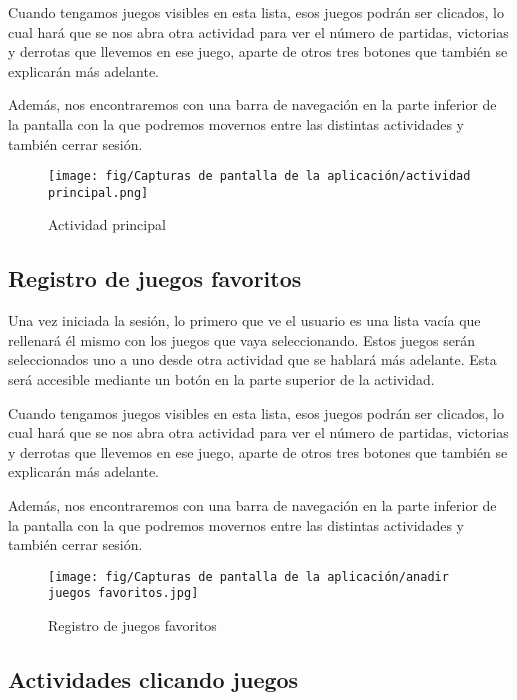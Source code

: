 Cuando tengamos juegos visibles en esta lista, esos juegos podrán ser clicados, lo cual hará que se nos abra otra actividad para ver el número de partidas, victorias y derrotas que llevemos en ese juego, aparte de otros tres botones que también se explicarán más adelante.

Además, nos encontraremos con una barra de navegación en la parte inferior de la pantalla con la que podremos movernos entre las distintas actividades y también cerrar sesión.


\begin{figure}[H]
    \centering
    \texttt{[image: fig/Capturas de pantalla de la aplicación/actividad principal.png]}
    \caption{Actividad principal}
    \label{fig:actividad principal}
\end{figure}

\subsection{Registro de juegos favoritos}\label{cap:Actividad principal}

Una vez iniciada la sesión, lo primero que ve el usuario es una lista vacía que rellenará él mismo con los juegos que vaya seleccionando. Estos juegos serán seleccionados uno a uno desde otra actividad que se hablará más adelante. Esta será accesible mediante un botón en la parte superior de la actividad.

Cuando tengamos juegos visibles en esta lista, esos juegos podrán ser clicados, lo cual hará que se nos abra otra actividad para ver el número de partidas, victorias y derrotas que llevemos en ese juego, aparte de otros tres botones que también se explicarán más adelante.

Además, nos encontraremos con una barra de navegación en la parte inferior de la pantalla con la que podremos movernos entre las distintas actividades y también cerrar sesión.


\begin{figure}[H]
    \centering
    \texttt{[image: fig/Capturas de pantalla de la aplicación/anadir juegos favoritos.jpg]}
    \caption{Registro de juegos favoritos}
    \label{fig:registro juegos favoritos}
\end{figure}

\subsection{Actividades clicando juegos}

